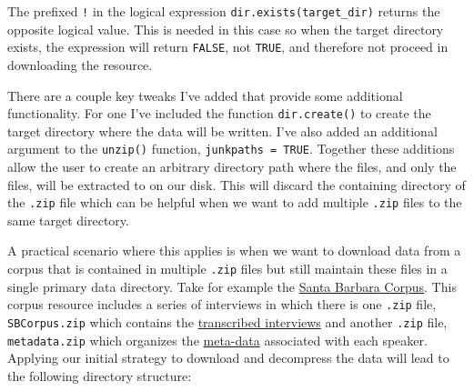 \documentclass[
  letterpaper,
]{latex/krantz}
\begin{document}
\begin{tcolorbox}[enhanced jigsaw, toprule=.15mm, bottomtitle=1mm, coltitle=black, title=\textcolor{quarto-callout-warning-color}{\faExclamationTriangle}\hspace{0.5em}{Tip}, left=2mm, colframe=quarto-callout-warning-color-frame, bottomrule=.15mm, colbacktitle=quarto-callout-warning-color!10!white, leftrule=.75mm, colback=white, titlerule=0mm, breakable, toptitle=1mm, opacityback=0, arc=.35mm, rightrule=.15mm, opacitybacktitle=0.6]

The prefixed \texttt{!} in the logical expression
\texttt{dir.exists(target\_dir)} returns the opposite logical value.
This is needed in this case so when the target directory exists, the
expression will return \texttt{FALSE}, not \texttt{TRUE}, and therefore
not proceed in downloading the resource.

\end{tcolorbox}

There are a couple key tweaks I've added that provide some additional
functionality. For one I've included the function \texttt{dir.create()}
to create the target directory where the data will be written. I've also
added an additional argument to the \texttt{unzip()} function,
\texttt{junkpaths\ =\ TRUE}. Together these additions allow the user to
create an arbitrary directory path where the files, and only the files,
will be extracted to on our disk. This will discard the containing
directory of the \texttt{.zip} file which can be helpful when we want to
add multiple \texttt{.zip} files to the same target directory.

A practical scenario where this applies is when we want to download data
from a corpus that is contained in multiple \texttt{.zip} files but
still maintain these files in a single primary data directory. Take for
example the
\href{http://www.linguistics.ucsb.edu/research/santa-barbara-corpus}{Santa
Barbara Corpus}. This corpus resource includes a series of interviews in
which there is one \texttt{.zip} file, \texttt{SBCorpus.zip} which
contains the
\href{http://www.linguistics.ucsb.edu/sites/secure.lsit.ucsb.edu.ling.d7/files/sitefiles/research/SBC/SBCorpus.zip}{transcribed
interviews} and another \texttt{.zip} file, \texttt{metadata.zip} which
organizes the
\href{http://www.linguistics.ucsb.edu/sites/secure.lsit.ucsb.edu.ling.d7/files/sitefiles/research/SBC/metadata.zip}{meta-data}
associated with each speaker. Applying our initial strategy to download
and decompress the data will lead to the following directory structure:
\end{document}
